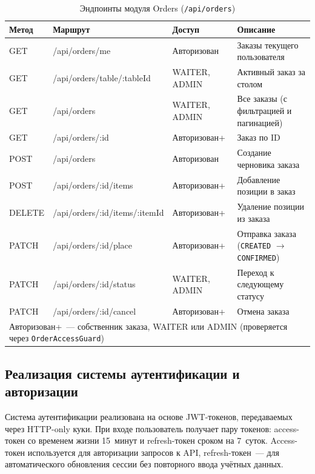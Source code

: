 \begin{table}[H]
\centering
\caption{Эндпоинты модуля Orders (\texttt{/api/orders})}
\label{tab:api_orders}
\begin{tabular}{|p{1.8cm}|p{5.4cm}|p{2.9cm}|p{4.8cm}|}
\hline
\textbf{Метод} & \textbf{Маршрут} & \textbf{Доступ} &
\textbf{Описание} \\
\hline
GET    & /api/orders/me                  & Авторизован &
  Заказы текущего пользователя \\ \hline
GET    & /api/orders/table/:tableId      & WAITER, ADMIN &
  Активный заказ за столом \\ \hline
GET    & /api/orders                     & WAITER, ADMIN &
  Все заказы (с фильтрацией и пагинацией) \\ \hline
GET    & /api/orders/:id                 & Авторизован+ &
  Заказ по ID \\ \hline
POST   & /api/orders                     & Авторизован &
  Создание черновика заказа \\ \hline
POST   & /api/orders/:id/items           & Авторизован+ &
  Добавление позиции в заказ \\ \hline
DELETE & /api/orders/:id/items/:itemId   & Авторизован+ &
  Удаление позиции из заказа \\ \hline
PATCH  & /api/orders/:id/place           & Авторизован+ &
  Отправка заказа (\texttt{CREATED} $\to$ \texttt{CONFIRMED}) \\ \hline
PATCH  & /api/orders/:id/status          & WAITER, ADMIN &
  Переход к следующему статусу \\ \hline
PATCH  & /api/orders/:id/cancel          & Авторизован+ &
  Отмена заказа \\ \hline
\multicolumn{4}{|l|}{\footnotesize
  Авторизован+~--- собственник заказа, WAITER или ADMIN
  (проверяется через \texttt{OrderAccessGuard})} \\ \hline
\end{tabular}
\end{table}

\subsection{Реализация системы аутентификации и авторизации}

Система аутентификации реализована на основе JWT-токенов,
передаваемых через HTTP-only куки. При входе пользователь получает
пару токенов: access-токен со временем жизни 15~минут и refresh-токен
сроком на 7~суток. Access-токен используется для авторизации запросов
к API, refresh-токен~--- для автоматического обновления сессии без
повторного ввода учётных данных.

